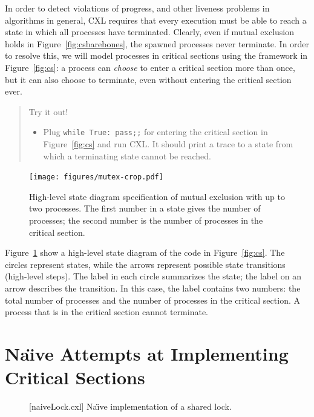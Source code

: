 \documentclass{report}
\newenvironment{code}{
\tcolorbox
}{
\endtcolorbox
}
\begin{document}
In order to detect violations of progress, and other liveness problems in
algorithms in general, CXL requires that every execution must be
able to reach a state in which all processes have terminated.
Clearly, even if mutual exclusion holds in Figure~\ref{fig:csbarebones},
the spawned processes never terminate.  In order to resolve this, we
will model processes in critical sections using the framework in
Figure~\ref{fig:cs}: a process can \emph{choose} to enter a
critical section more than once, but it can also choose to terminate, even
without entering the critical section ever.

\begin{quote}
Try it out!
\begin{itemize}
\item Plug \texttt{while True: pass;;} for entering the critical section
in Figure~\ref{fig:cs} and run CXL.  It should print a trace
to a state from which a terminating state cannot be reached.
\end{itemize}
\end{quote}

\begin{figure}
\begin{center}
\texttt{[image: figures/mutex-crop.pdf]}
\end{center}
\caption{High-level state diagram specification of mutual exclusion with up to two processes.
The first number in a state gives the number of processes; the second number is the
number of processes in the critical section.}
\label{fig:mutex}
\end{figure}

Figure~\ref{fig:mutex} show a high-level state diagram
of the code in
Figure~\ref{fig:cs}.
The circles represent states, while the arrows represent possible state
transitions (high-level steps).  The label in each circle summarizes the state;
the label on an arrow describes the transition.  In this case,
the label contains two numbers: the total number of processes and the number
of processes in the critical section.  A process that is in the critical
section cannot terminate.

\chapter{Na\"{\i}ve Attempts at Implementing Critical Sections}

\begin{figure}
\begin{code}
\end{code}
\caption{[naiveLock.cxl] Na\"{\i}ve implementation of a shared lock.}
\label{fig:uplock}
\end{figure}
\end{document}
